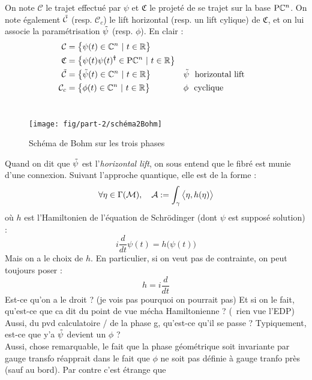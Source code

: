 On note $\mathcal{C}$ le trajet effectué par $\psi$ et $\mathfrak{C}$ le projeté de se trajet sur la base $\text{\normalfont P}\mathbb{C}^{n}$. On note également $\Tilde{\mathcal{C}}$ (resp. $\mathcal{C}_c$) le lift horizontal (resp. un lift cylique) de $\mathfrak{C}$, et on lui associe la paramétrisation $\Tilde{\psi}$ (resp. $\phi$). En clair :
\begin{align*}
	\mathcal{C} &= \big\{ \psi(t)\in\C^n\ |\  t\in\R \big\} \\
	\mathfrak{C} &= \big\{ \psi(t) \psi(t)^\dagger \in\PC{n}\ |\  t\in\R \big\} \\
	\Tilde{\mathcal{C}} &= \big\{ \Tilde{\psi}(t)\in\C^n\ |\  t\in\R \big\}  &  &\Tilde{\psi}\ \text{ horizontal lift}\\
	\mathcal{C}_c &= \big\{ \phi(t)\in\C^n\ |\  t\in\R \big\}  &  &\phi\ \text{ cyclique}
\end{align*}
\\
\begin{figure}[h]\centering
	\texttt{[image: fig/part-2/schéma2Bohm]}
	\caption{Schéma de Bohm \cite{bohm_geometric_2003} sur les trois phases}
	\label{fig:2lifts}
\end{figure}

Quand on dit que $\Tilde{\psi}$ est l'\textit{horizontal lift}, on sous entend que le fibré est munie d'une connexion. Suivant l'approche quantique, elle est de la forme :
\[\forall \eta\in\Gamma(\mathcal{M}),\quad  \mathcal{A} := \int_\gamma \big\langle \eta, h(\eta) \big\rangle\]
où $h$ est l'Hamiltonien de l'équation de Schrödinger (dont $\psi$ est supposé solution) :
\begin{equation}\label{eq:schrodinger}
	i\frac{d}{dt} \psi(t) = h\big(\psi(t)\big)
\end{equation}
Mais on a le choix de $h$. En particulier, si on veut pas de contrainte, on peut toujours poser :
\[h = i\frac{d}{dt}\]
Est-ce qu'on a le droit ? (je vois pas pourquoi on pourrait pas) Et si on le fait, qu'est-ce que ca dit du point de vue mécha Hamiltonienne ? (\apriori~rien vue l'EDP)
\\
Aussi, du pvd calculatoire / de la phase g, qu'est-ce qu'il se passe ? Typiquement, est-ce que y'a $\Tilde{\psi}$ devient un $\phi$ ?
\\

Aussi, chose remarquable, le fait que la phase géométrique soit invariante par gauge transfo réapprait dans le fait que $\phi$ ne soit pas définie à gauge tranfo près (sauf au bord). Par contre c'est étrange que 



